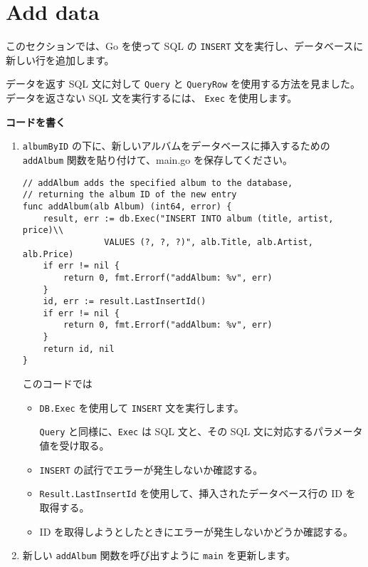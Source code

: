 \section{Add data}

このセクションでは、Go を使って SQL の \texttt{INSERT}
文を実行し、データベースに新しい行を追加します。

データを返す SQL 文に対して \texttt{Query} と \texttt{QueryRow}
を使用する方法を見ました。データを返さない SQL 文を実行するには、
\texttt{Exec} を使用します。

\textbf{コードを書く}



\begin{enumerate}

\item
  \texttt{albumByID}
  の下に、新しいアルバムをデータベースに挿入するための \texttt{addAlbum}
  関数を貼り付けて、main.go を保存してください。

\begin{lstlisting}[numbers=none]
// addAlbum adds the specified album to the database,
// returning the album ID of the new entry
func addAlbum(alb Album) (int64, error) {
    result, err := db.Exec("INSERT INTO album (title, artist, price)\\
                VALUES (?, ?, ?)", alb.Title, alb.Artist, alb.Price)
    if err != nil {
        return 0, fmt.Errorf("addAlbum: %v", err)
    }
    id, err := result.LastInsertId()
    if err != nil {
        return 0, fmt.Errorf("addAlbum: %v", err)
    }
    return id, nil
}
\end{lstlisting}

  このコードでは

  \begin{itemize}
  \item
    \texttt{DB.Exec} を使用して \texttt{INSERT} 文を実行します。

    \texttt{Query} と同様に、\texttt{Exec} は SQL 文と、その SQL
    文に対応するパラメータ値を受け取る。
  \item
    \texttt{INSERT} の試行でエラーが発生しないか確認する。
  \item
    \texttt{Result.LastInsertId} を使用して、挿入されたデータベース行の
    ID を取得する。
  \item
    ID を取得しようとしたときにエラーが発生しないかどうか確認する。
  \end{itemize}



\item
  新しい \texttt{addAlbum} 関数を呼び出すように \texttt{main}
  を更新します。


\end{enumerate}
